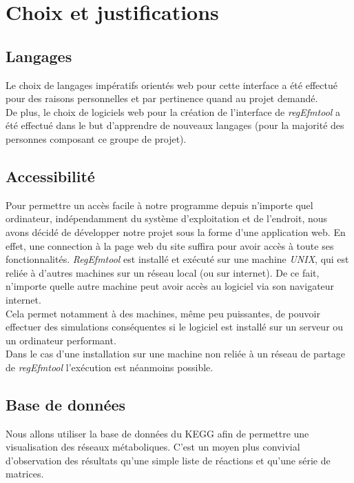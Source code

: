 \chapter{Choix et justifications}

\section{Langages}
Le choix de langages impératifs orientés web pour cette interface a été effectué pour des raisons personnelles et par pertinence quand au projet demandé.\\
De plus, le choix de logiciels web pour la création de l'interface de \emph{regEfmtool} a été effectué dans le but d'apprendre de nouveaux langages (pour la majorité des personnes composant ce groupe de projet).

\section{Accessibilité}
Pour permettre un accès facile à notre programme depuis n'importe quel ordinateur, indépendamment du système d'exploitation et de l'endroit, nous avons décidé de développer notre projet sous la forme d'une application web. En effet, une connection à la page web du site suffira pour avoir accès à toute ses fonctionnalités. \emph{RegEfmtool} est installé et exécuté sur une machine \emph{UNIX}, qui est reliée à d'autres machines sur un réseau local (ou sur internet). De ce fait, n'importe quelle autre machine peut avoir accès au logiciel via son navigateur internet.\\
Cela permet notamment à des machines, même peu puissantes, de pouvoir effectuer des simulations conséquentes si le logiciel est installé sur un serveur ou un ordinateur performant.\\
Dans le cas d'une installation sur une machine non reliée à un réseau de partage de \emph{regEfmtool} l'exécution est néanmoins possible.

\section{Base de données}
Nous allons utiliser la base de données du KEGG afin de permettre une visualisation des réseaux métaboliques. C'est un moyen plus convivial d'observation des résultats qu'une simple liste de réactions et qu'une série de matrices. 
